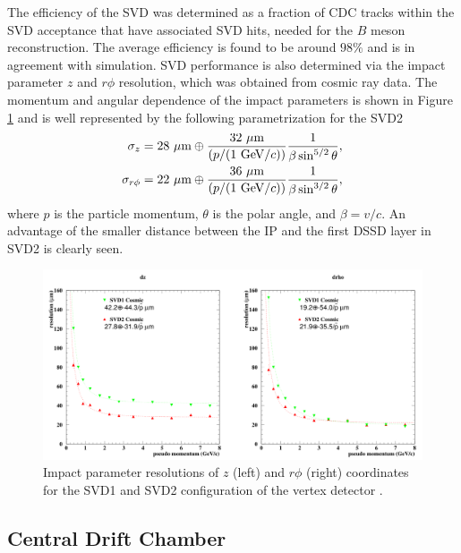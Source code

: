 The efficiency of the SVD was determined as a fraction of CDC tracks within the SVD acceptance that have associated SVD hits, needed for the $B$ meson reconstruction. The average efficiency is found to be around $98\%$ and is in agreement with simulation. SVD performance is also determined via the impact parameter $z$ and $r\phi$ resolution, which was obtained from cosmic ray data. The momentum and angular dependence of the impact parameters is shown in Figure \ref{fig:SVD_performance} and is well represented by the following parametrization for the SVD2
\begin{align}
\sigma_z = 28\mathrm{~\mu m}\oplus \frac{32\mathrm{~\mu m}}{\left(p/(1\mathrm{~GeV}/c)\right)}\frac{1}{\beta \sin^{5/2}\theta},\\
\sigma_{r\phi} = 22\mathrm{~\mu m}\oplus \frac{36\mathrm{~\mu m}}{\left(p/(1\mathrm{~GeV}/c)\right)}\frac{1}{\beta \sin^{3/2}\theta},
\end{align}
where $p$ is the particle momentum, $\theta$ is the polar angle, and $\beta=v/c$. An advantage of the smaller distance between the IP and the first DSSD layer in SVD2 is clearly seen.

\begin{figure}[H]
	\centering
	\captionsetup{width=0.8\linewidth}
	\includegraphics[width=\linewidth]{fig/setup/SVD_performance_1}
	\caption{Impact parameter resolutions of $z$ (left) and $r\phi$ (right) coordinates for the SVD1 and SVD2 configuration of the vertex detector \cite{haba2004letter}.}
	\label{fig:SVD_performance}
\end{figure}


\subsection{Central Drift Chamber}

